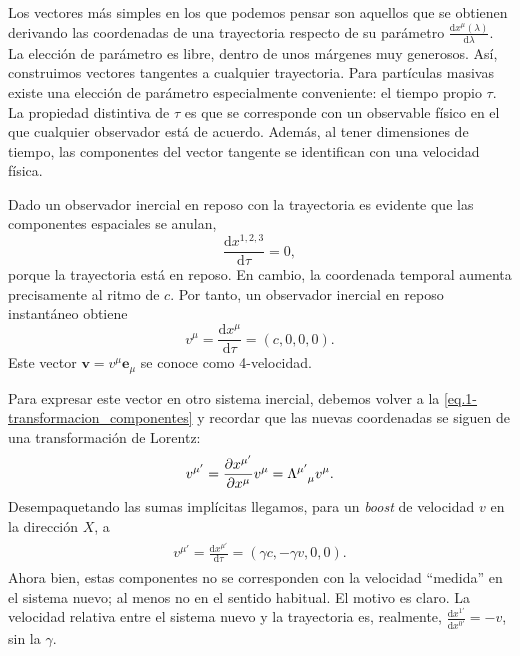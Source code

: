 Los vectores más simples en los que podemos pensar son aquellos que se obtienen derivando las coordenadas de una trayectoria respecto de su parámetro \(\frac{\mathrm{d}x^\mu(\lambda)}{\mathrm{d}\lambda}\). La elección de parámetro es libre, dentro de unos márgenes muy generosos. Así, construimos vectores tangentes a cualquier trayectoria. Para partículas masivas existe una elección de parámetro especialmente conveniente: el tiempo propio \(\tau\). La propiedad distintiva de \(\tau\) es que se corresponde con un observable físico en el que cualquier observador está de acuerdo. Además, al tener dimensiones de tiempo, las componentes del vector tangente se identifican con una velocidad física.

Dado un observador inercial en reposo con la trayectoria es evidente que las componentes espaciales se anulan,
\begin{equation*}
    \frac{\mathrm{d}x^{1, 2, 3}}{\mathrm{d}\tau} = 0,
\end{equation*}
porque la trayectoria está en reposo. En cambio, la coordenada temporal aumenta precisamente al ritmo de \(c\). Por tanto, un observador inercial en reposo instantáneo obtiene 
\begin{equation}
    v^\mu = \frac{\mathrm{d}x^\mu}{\mathrm{d}\tau} = (c, 0, 0, 0).
\end{equation}
Este vector \(\mathbf{v} = v^\mu \mathbf{e}_\mu\) se conoce como 4-velocidad.

Para expresar este vector en otro sistema inercial, debemos volver a la \cref{eq.1-transformacion_componentes} y recordar que las nuevas coordenadas se siguen de una transformación de Lorentz:
\begin{equation}
    v^{\mu'} = \jcbn{x}{\mu'}{x}{\mu} v^{\mu} = \tensor{\Lambda}{^{\mu'}_\mu} v^{\mu}.
\end{equation}
Desempaquetando las sumas implícitas llegamos, para un \textit{boost} de velocidad \(v\) en la dirección \(X\), a
\begin{align*}
    \begin{aligned}
        v^{\mu'} = \frac{\mathrm{d}x^{\mu'}}{\mathrm{d}\tau} = (\gamma c, -\gamma v, 0, 0).
    \end{aligned}
\end{align*}
Ahora bien, estas componentes no se corresponden con la velocidad ``medida'' en el sistema nuevo; al menos no en el sentido habitual. El motivo es claro. La velocidad relativa entre el sistema nuevo y la trayectoria es, realmente, \(\frac{\mathrm{d}x^{1'}}{\mathrm{d}x^{0'}}=-v\), sin la \(\gamma\).


